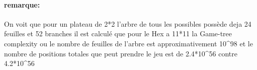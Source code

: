 \paragraph {remarque:}
On voit que pour un plateau de 2*2 l'arbre de tous les possibles possède deja 24 feuilles et 52 branches
il est calculé que pour le Hex a 11*11 la Game-tree complexity ou le nombre de feuilles de l'arbre est
approximativement 10^98 et le nombre de positions totales que peut prendre le jeu est de 2.4*10^56 contre
4.2*10^56
